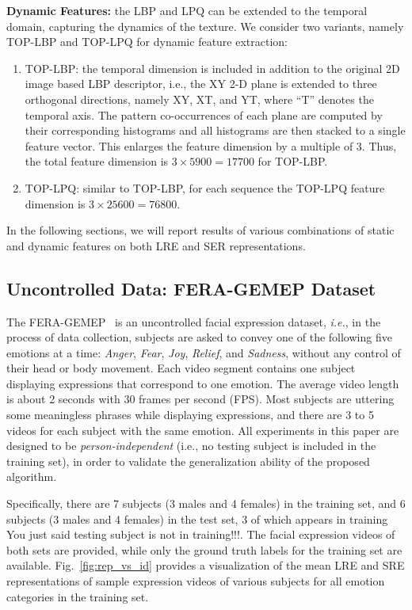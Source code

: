 \documentclass[journal]{IEEEtran}
\begin{document}
\textbf{Dynamic Features:} the LBP and LPQ can be extended to the temporal domain, capturing the dynamics of the texture. We consider two variants, namely TOP-LBP and TOP-LPQ for dynamic feature extraction:
\begin{enumerate}
\item TOP-LBP: the temporal dimension is included in addition to the original 2D image based LBP descriptor, i.e.,  the XY 2-D plane is extended to three orthogonal directions, namely XY, XT, and YT, where ``T'' denotes the temporal axis. The pattern co-occurrences of each plane are computed by their corresponding histograms and all histograms are then stacked to a single feature vector. This enlarges the feature dimension by a multiple of $3$. Thus, the total feature dimension is $3\times 5900=17700$ for TOP-LBP.

\item TOP-LPQ: similar to TOP-LBP, for each sequence the TOP-LPQ feature dimension is $3\times 25600=76800$.  
\end{enumerate} 

In the following sections, we will report results of various combinations of static and dynamic features on both LRE and SER representations. 

\subsection{Uncontrolled Data: FERA-GEMEP Dataset}

The FERA-GEMEP~\cite{FERA_data} is an uncontrolled facial expression dataset, \textit{i.e.}, in the process of data collection, subjects are asked to convey one of the following five emotions at a time: \textit{Anger}, \textit{Fear}, \textit{Joy}, \textit{Relief}, and \textit{Sadness}, without any control of their head or body movement. Each video segment contains one subject displaying expressions that correspond to one emotion. The average video length is about 2 seconds with 30 frames per second (FPS). Most subjects are uttering some meaningless phrases while displaying expressions, and there are 3 to 5 videos for each subject with the same emotion. All experiments in this paper are designed to be \textit{person-independent} (i.e., no testing subject is included in the training set), in order to validate the generalization ability of the proposed algorithm. 

Specifically, there are 7 subjects (3 males and 4 females) in the training set, and 6 subjects (\textcolor[rgb]{1,0,0}{3 males and 4 females}) in the test set, \textcolor[rgb]{1,0,0}{3 of which appears in training You just said testing subject is not in training!!!}. The facial expression videos of both sets are provided, while only the ground truth labels for the training set are available. Fig.~\ref{fig:rep_vs_id} provides a visualization of the mean LRE and SRE representations of sample expression videos of various subjects for all emotion categories in the training set. 
\end{document}

